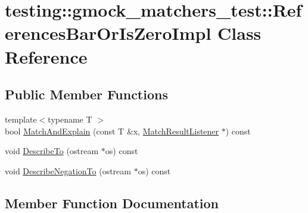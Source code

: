 \hypertarget{classtesting_1_1gmock__matchers__test_1_1_references_bar_or_is_zero_impl}{}\section{testing\+:\+:gmock\+\_\+matchers\+\_\+test\+:\+:References\+Bar\+Or\+Is\+Zero\+Impl Class Reference}
\label{classtesting_1_1gmock__matchers__test_1_1_references_bar_or_is_zero_impl}
\subsection*{Public Member Functions}
\begin{DoxyCompactItemize}
\item 
{\footnotesize template$<$typename T $>$ }\\bool \hyperlink{classtesting_1_1gmock__matchers__test_1_1_references_bar_or_is_zero_impl_a80c748aab6200486118449625689e76a}{Match\+And\+Explain} (const T \&x, \hyperlink{classtesting_1_1_match_result_listener}{Match\+Result\+Listener} $\ast$) const 
\item 
void \hyperlink{classtesting_1_1gmock__matchers__test_1_1_references_bar_or_is_zero_impl_ae2be57a63162de12626a503ffaa986b4}{Describe\+To} (ostream $\ast$os) const 
\item 
void \hyperlink{classtesting_1_1gmock__matchers__test_1_1_references_bar_or_is_zero_impl_aa1c5da8f340427b804e93fe3c00f0165}{Describe\+Negation\+To} (ostream $\ast$os) const 
\end{DoxyCompactItemize}


\subsection{Member Function Documentation}

